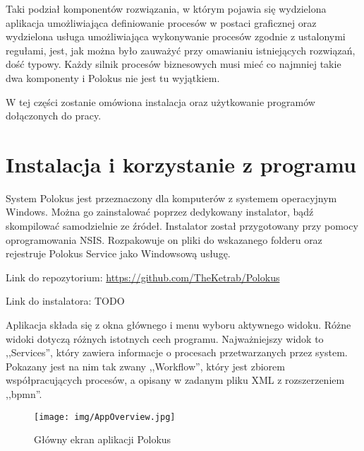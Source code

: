 \documentclass[declaration,shortabstract,mgr]{iithesis}
\begin{document}
Taki podział komponentów rozwiązania, w którym pojawia się wydzielona aplikacja umożliwiająca definiowanie procesów w postaci graficznej oraz wydzielona usługa umożliwiająca wykonywanie procesów zgodnie z ustalonymi regułami, jest, jak można było zauważyć przy omawianiu istniejących rozwiązań, dość typowy. Każdy silnik procesów biznesowych musi mieć co najmniej takie dwa komponenty i Polokus nie jest tu wyjątkiem.

W tej części zostanie omówiona instalacja oraz użytkowanie programów dołączonych do pracy.

\section{Instalacja i korzystanie z programu}

System Polokus jest przeznaczony dla komputerów z systemem operacyjnym Windows. Można go zainstalować poprzez dedykowany instalator, bądź skompilować samodzielnie ze źródeł. Instalator został przygotowany przy pomocy oprogramowania NSIS. Rozpakowuje on pliki do wskazanego folderu oraz rejestruje Polokus Service jako Windowsową usługę.

\noindent Link do repozytorium: \href{https://github.com/TheKetrab/Polokus}{https://github.com/TheKetrab/Polokus}

\noindent Link do instalatora: TODO



Aplikacja składa się z okna głównego i menu wyboru aktywnego widoku. Różne widoki dotyczą różnych istotnych cech programu. Najważniejszy widok to ,,Services'', który zawiera informacje o procesach przetwarzanych przez system. Pokazany jest na nim tak zwany ,,Workflow'', który jest zbiorem współpracujących procesów, a opisany w zadanym pliku XML z rozszerzeniem ,,bpmn''.

\begin{figure}[H]
    \texttt{[image: img/AppOverview.jpg]}
    \caption{Główny ekran aplikacji Polokus}
    \label{fig:polokus-app}
\end{figure}
\end{document}
